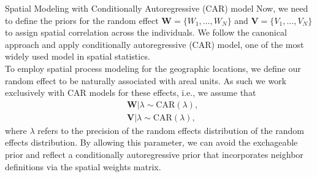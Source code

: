 \documentclass[a4paper, 12pt]{article}
\makeatletter
\renewcommand{\section}{\@startsection
	{section}    {1}    {0mm}    {-0.7\baselineskip}    {0.08\baselineskip}    {\normalfont\large\sc\center\bf}}
\makeatother
\begin{document}
\section{Spatial Modeling with Conditionally Autoregressive (CAR) model}
\noindent Now, we need to define the priors for the random effect $\mathbf{W}=\{W_1,...,W_N\}$ and $\mathbf{V}=\{V_1,...,V_N\}$ to assign spatial correlation across the individuals. We follow the canonical approach and apply conditionally autoregressive (CAR) model, one of the most widely used model in spatial statistics.\\ \newline
To employ spatial process modeling for the geographic locations, we define our random effect to be naturally associated with
areal units. As such we work exclusively with CAR models for these effects, i.e., we assume
that
\begin{equation}
\begin{aligned}
&\mathbf{W}|\lambda \sim \mbox{CAR}(\lambda),\\
&\mathbf{V}|\lambda \sim \mbox{CAR}(\lambda),
\end{aligned}
\end{equation}
where $\lambda$ refers to the precision of the random effects distribution of the random effects distribution. By allowing this parameter, we can avoid the exchageable prior and reflect a conditionally autoregressive prior that incorporates neighbor definitions via the spatial weights matrix.
\end{document}

